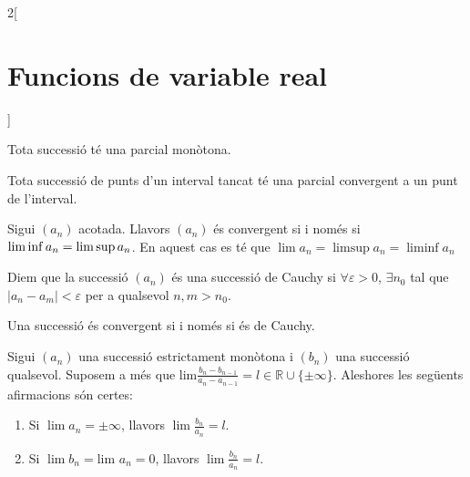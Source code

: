 \documentclass[../../../main.tex]{subfiles}
\begin{document}
\begin{multicols}{2}[\section{Funcions de variable real}]
\begin{prop}
\end{prop}
\begin{prop}
Tota successió té una parcial mo\-nò\-to\-na.
\end{prop}
\begin{theorem}
Tota successió de punts d’un interval tancat té una parcial convergent a un punt de l'interval.
\end{theorem}
\begin{lemma}
Sigui $(a_n)$ acotada. Llavors $(a_n)$ és convergent si i només si $\liminf a_n\\=\limsup a_n$. En aquest cas es té que $\lim a_n=\limsup a_n=\liminf a_n$
\end{lemma}
\begin{definition}
Diem que la successió $(a_n)$ és una successió de Cauchy si $\forall \varepsilon>0$, $\exists n_0$ tal que $|a_n-a_m|<\varepsilon$ per a qualsevol $n,m>n_0$.
\end{definition}
\begin{theorem}
Una successió és convergent si i només si és de Cauchy.
\end{theorem}
\begin{theorem}
Sigui $(a_n)$ una successió estrictament monòtona i $(b_n)$ una successió qualsevol. Suposem a més que $\text{lim}\frac{b_n-b_{n-1}}{a_n-a_{n-1}}=l\in\mathbb{R}\cup\{\pm\infty\}$. Aleshores les següents afirmacions són certes:
\begin{enumerate}
    \item Si $\lim a_n=\pm\infty$, llavors $\lim\frac{b_n}{a_n}=l$.
    \item Si $\lim b_n=\text{lim }a_n=0$, llavors $\lim\frac{b_n}{a_n}=l$.
\end{enumerate}
\end{theorem}

\end{multicols}
\end{document}
